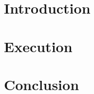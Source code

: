 








\tableofcontents
\newpage
\printacronyms[heading=chapter*]
\newpage
{}

\chapter{Introduction}


\chapter{Execution}


\chapter{Conclusion}


\printbibliography%


